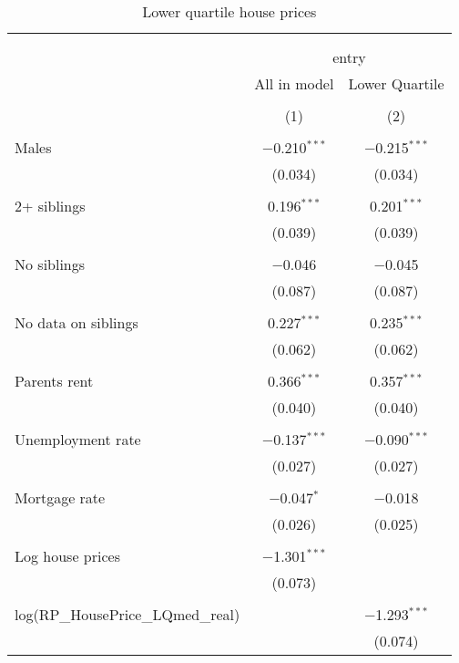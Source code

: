 
\begin{table}[!htbp] \centering 
  \caption{Lower quartile house prices} 
  \label{LwrQ} 
\begin{tabular}{@{\extracolsep{1pt}}lcc} 
\\[-1.8ex]\hline 
\hline \\[-1.8ex] 
\\[-1.8ex] & \multicolumn{2}{c}{entry} \\ 
 & All in model & Lower Quartile \\ 
\\[-1.8ex] & (1) & (2)\\ 
\hline \\[-1.8ex] 
 Males & $-$0.210$^{***}$ & $-$0.215$^{***}$ \\ 
  & (0.034) & (0.034) \\ 
  & & \\ 
 2+ siblings & 0.196$^{***}$ & 0.201$^{***}$ \\ 
  & (0.039) & (0.039) \\ 
  & & \\ 
 No siblings & $-$0.046 & $-$0.045 \\ 
  & (0.087) & (0.087) \\ 
  & & \\ 
 No data on siblings & 0.227$^{***}$ & 0.235$^{***}$ \\ 
  & (0.062) & (0.062) \\ 
  & & \\ 
 Parents rent & 0.366$^{***}$ & 0.357$^{***}$ \\ 
  & (0.040) & (0.040) \\ 
  & & \\ 
 Unemployment rate & $-$0.137$^{***}$ & $-$0.090$^{***}$ \\ 
  & (0.027) & (0.027) \\ 
  & & \\ 
 Mortgage rate & $-$0.047$^{*}$ & $-$0.018 \\ 
  & (0.026) & (0.025) \\ 
  & & \\ 
 Log house prices & $-$1.301$^{***}$ &  \\ 
  & (0.073) &  \\ 
  & & \\ 
 log(RP\_HousePrice\_LQmed\_real) &  & $-$1.293$^{***}$ \\ 
  &  & (0.074) \\ 

\end{tabular}
\end{table}
